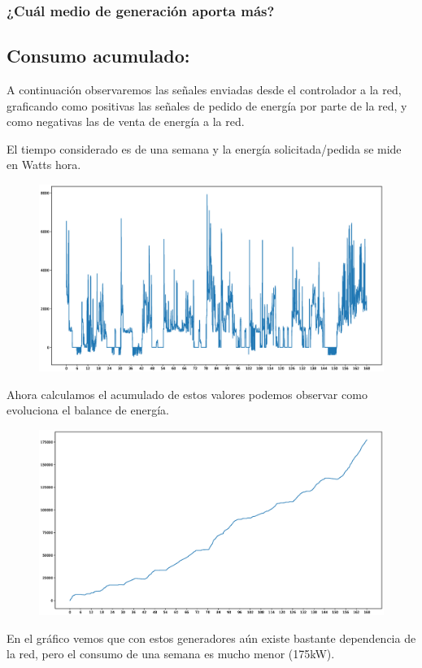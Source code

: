 \subsubsection{¿Cuál medio de generación aporta más?}



\subsection{Consumo acumulado:}
A continuación observaremos las señales enviadas desde el controlador a la red, graficando
como positivas las señales de pedido de energía por parte de la red, y como negativas las
de venta de energía a la red.

El tiempo considerado es de una semana y la energía solicitada/pedida se mide en Watts hora.

\begin{figure}[H]
    \centering
    \includegraphics[scale=0.3]{images/cons.eps}
\end{figure}

Ahora calculamos el acumulado de estos valores podemos observar como evoluciona el
balance de energía. 

\begin{figure}[H]
    \centering
    \includegraphics[scale=0.3]{images/acc.eps}
\end{figure}

En el gráfico vemos que con estos generadores aún existe bastante dependencia de la red,
pero el consumo de una semana es mucho menor (175kW).